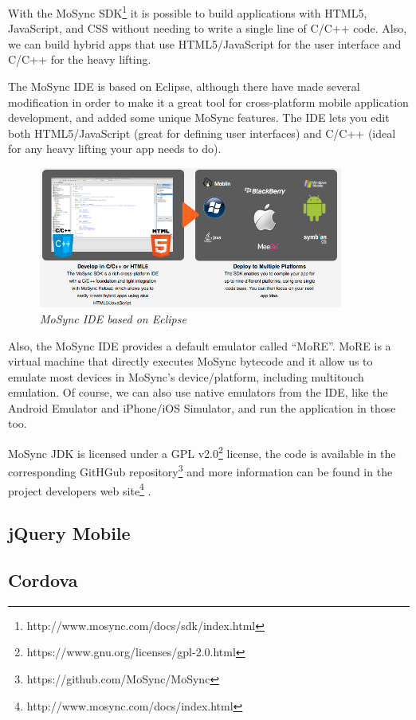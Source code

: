 \documentclass[a4paper,12pt]{book}
\begin{document}
With the MoSync SDK\footnote{http://www.mosync.com/docs/sdk/index.html}  it is possible to build applications with HTML5, JavaScript, and CSS without needing to write a single line of C/C++ code. Also, we can build hybrid apps that use HTML5/JavaScript for the user interface and C/C++ for the heavy lifting. 

The MoSync IDE is based on Eclipse, although there have made several modification in order to make it a great tool for cross-platform mobile application development,  and added  some unique MoSync features. The IDE lets you edit both HTML5/JavaScript (great for defining user interfaces) and C/C++ (ideal for any heavy lifting your app needs to do).

\begin{figure}[H]
    \centering
    \includegraphics[width=10cm, keepaspectratio]{img/mosync.png}
    \caption{\textit{MoSync IDE based on Eclipse}}
 \end{figure}
 
Also, the MoSync IDE provides a default emulator called  “MoRE”. MoRE is a  virtual machine that directly executes MoSync bytecode and  it allow us to emulate most devices in MoSync's device/platform, including  multitouch emulation. Of course, we can also use native emulators from the IDE, like the Android Emulator and iPhone/iOS Simulator, and run the application in those too.

MoSync JDK is licensed under a GPL v2.0\footnote{https://www.gnu.org/licenses/gpl-2.0.html}  license, the code is available in the corresponding GitHGub repository\footnote{https://github.com/MoSync/MoSync}  and more information can be found in the project developers web site\footnote{http://www.mosync.com/docs/index.html} .

\subsection{jQuery Mobile}
\label{jQuery Mobile}

\subsection{Cordova}
\label{Cordova} 
\end{document}
